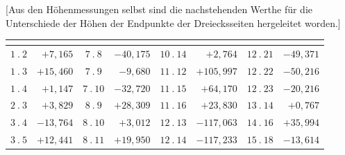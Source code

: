 \par\medskip
\par\noindent\hspace*{\parindent}[Aus den Höhenmessungen selbst sind die nachstehenden Werthe für
die Unterschiede der Höhen der Endpunkte der Dreiecksseiten hergeleitet worden.]


\par\medskip
{\centering
\setlength{\tabcolsep}{.24em}
\begin{tabular}{|c|r||c|r||c|r||c|r|}
&&
&&
&&
&\\[2pt]
\hline
\(1\ .\ 2\) & \(+7{,}165\) & \(7\ .\ 8\) & \(-40{,}175\) & \(10\ .\ 14\) & \(+2{,}764\) & \(12\ .\ 21\) & \(-49{,}371\)\\
\(1\ .\ 3\) & \(+15{,}460\) & \(7\ .\ 9\) & \(-9{,}680\) & \(11\ .\ 12\) & \(+105{,}997\) & \(12\ .\ 22\) & \(-50{,}216\)\\
\(1\ .\ 4\) & \(+1{,}147\) & \(7\ .\ 10\) & \(-32{,}720\) & \(11\ .\ 15\) & \(+64{,}170\) & \(12\ .\ 23\) & \(-20{,}216\)\\
\(2\ .\ 3\) & \(+3{,}829\) & \(8\ .\ 9\) & \(+28{,}309\) & \(11\ .\ 16\) & \(+23{,}830\) & \(13\ .\ 14\) & \(+0{,}767\)\\
\(3\ .\ 4\) & \(-13{,}764\) & \(8\ .\ 10\) & \(+3{,}012\) & \(12\ .\ 13\) & \(-117{,}063\) & \(14\ .\ 16\) & \(+35{,}994\)\\
\(3\ .\ 5\) & \(+12{,}441\) & \(8\ .\ 11\) & \(+19{,}950\) & \(12\ .\ 14\) & \(-117{,}233\) & \(15\ .\ 18\) & \(-13{,}614\)\\

\end{tabular}}
